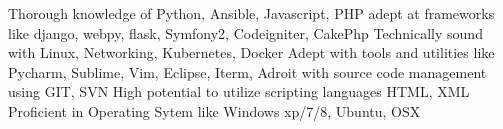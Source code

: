 
\begin{cvskills}
  \cvskill
    {Thorough knowledge of }
    {Python, Ansible, Javascript, PHP}
  \cvskill
    {adept at frameworks like}
    {django, webpy, flask, Symfony2, Codeigniter, CakePhp}
  \cvskill
    {Technically sound with}
    {Linux, Networking, Kubernetes, Docker}
  \cvskill
    {Adept with tools and utilities like}
    {Pycharm, Sublime, Vim, Eclipse, Iterm, }
  \cvskill
    {Adroit with source code management using}
    {GIT, SVN}
  \cvskill
    {High potential to utilize scripting languages}
    {HTML, XML}
  \cvskill
  {Proficient in Operating Sytem like}
  {Windows xp/7/8, Ubuntu, OSX}
\end{cvskills}
